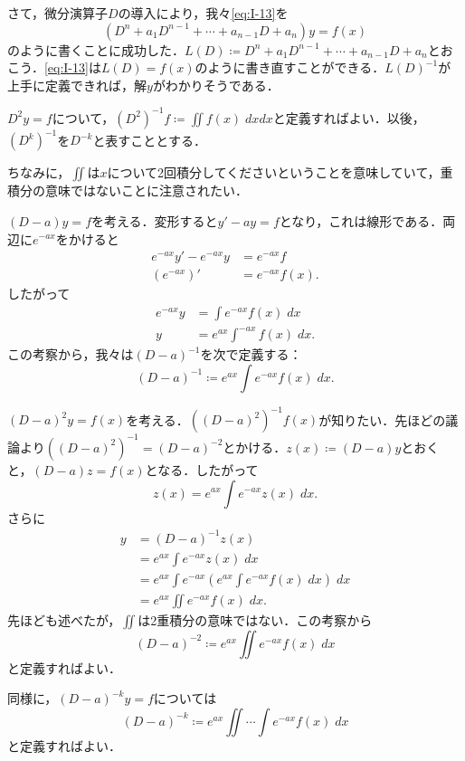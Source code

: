 さて，微分演算子$D$の導入により，我々\eqref{eq:I-13}を
\[ (D^n+a_1D^{n-1}+\cdots+a_{n-1}D+a_n)y = f(x)\]
のように書くことに成功した．$L(D) \coloneqq D^n+a_1D^{n-1}+\cdots+a_{n-1}D+a_n$とおこう．\eqref{eq:I-13}は$L(D)=f(x)$のように書き直すことができる．$L(D)^{-1}$が上手に定義できれば，解$y$がわかりそうである．

\begin{example}
    $D^2y = f$について，$(D^2)^{-1}f \coloneqq \iint f(x) \; dxdx$と定義すればよい．以後，$(D^k)^{-1}$を$D^{-k}$と表すこととする．

    ちなみに，$\iint$は$x$について2回積分してくださいということを意味していて，重積分の意味ではないことに注意されたい．
\end{example}

\begin{example}
    $(D-a)y=f$を考える．変形すると$y'-ay=f$となり，これは線形である．両辺に$e^{-ax}$をかけると
    \begin{align*}
        e^{-ax}y' -e^{-ax}y &= e^{-ax}f \\
        (e^{-ax})' &= e^{-ax}f(x).
    \end{align*}
    したがって
    \begin{align*}
        e^{-ax}y &= \int e^{-ax} f(x) \; dx \\
        y &= e^{ax} \int ^{-ax} f(x) \; dx.
    \end{align*}
    この考察から，我々は$(D-a)^{-1}$を次で定義する：
    \[ (D-a)^{-1} \coloneqq e^{ax} \int e^{-ax}f(x) \; dx.\]
\end{example}

\begin{example}
    $(D-a)^2y = f(x)$を考える．$((D-a)^2)^{-1}f(x)$が知りたい．先ほどの議論より$((D-a)^2)^{-1} = (D-a)^{-2}$とかける．$z(x) \coloneqq (D-a)y$とおくと，$(D-a)z=f(x)$となる．したがって
    \[ z(x) = e^{ax} \int e^{-ax} z(x) \; dx.\]
    さらに
    \begin{align*}
        y &= (D-a)^{-1} z(x) \\
        &= e^{ax} \int e^{-ax} z(x) \; dx \\
        &= e^{ax} \int e^{-ax} \left(e^{ax} \int e^{-ax} f(x) \; dx\right) \; dx \\
        &= e^{ax} \iint e^{-ax} f(x) \; dx.
    \end{align*}
    先ほども述べたが，$\iint$は2重積分の意味ではない．この考察から
    \[ (D-a)^{-2} \coloneqq e^{ax} \iint e^{-ax} f(x) \; dx\]
    と定義すればよい．

    同様に，$(D-a)^{-k}y=f$については
    \[ (D-a)^{-k} \coloneqq e^{ax} \iint \cdots \int e^{-ax} f(x) \; dx\]
    と定義すればよい．
\end{example}

